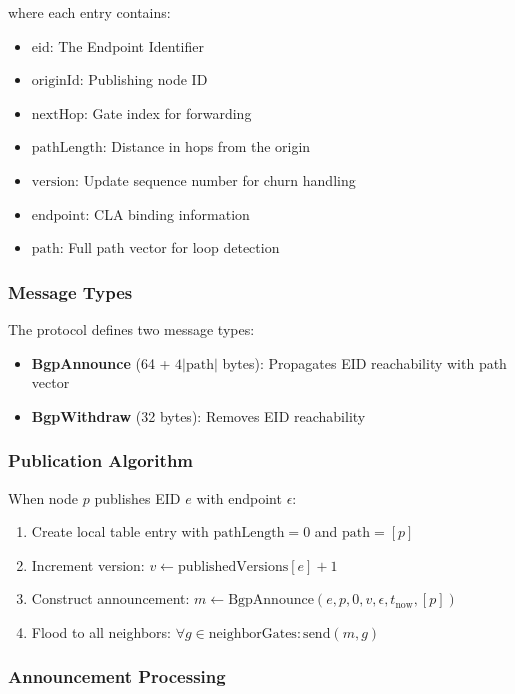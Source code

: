 \documentclass[journal,twocolumn]{IEEEtran}
\begin{document}
where each entry contains:
\begin{itemize}
    \item $\text{eid}$: The Endpoint Identifier
    \item $\text{originId}$: Publishing node ID
    \item $\text{nextHop}$: Gate index for forwarding
    \item $\text{pathLength}$: Distance in hops from the origin
    \item $\text{version}$: Update sequence number for churn handling
    \item $\text{endpoint}$: CLA binding information
    \item $\text{path}$: Full path vector for loop detection
\end{itemize}

\subsubsection{Message Types}

The protocol defines two message types:
\begin{itemize}
    \item \textbf{BgpAnnounce} (64 + $4|\text{path}|$ bytes): Propagates EID reachability with path vector
    \item \textbf{BgpWithdraw} (32 bytes): Removes EID reachability
\end{itemize}

\subsubsection{Publication Algorithm}

When node $p$ publishes EID $e$ with endpoint $\epsilon$:

\begin{enumerate}
    \item Create local table entry with $\text{pathLength} = 0$ and $\text{path} = [p]$
    \item Increment version: $v \leftarrow \text{publishedVersions}[e] + 1$
    \item Construct announcement: $m \leftarrow \text{BgpAnnounce}(e, p, 0, v, \epsilon, t_{\text{now}}, [p])$
    \item Flood to all neighbors: $\forall g \in \text{neighborGates}: \text{send}(m, g)$
\end{enumerate}

\subsubsection{Announcement Processing}
\end{document}
